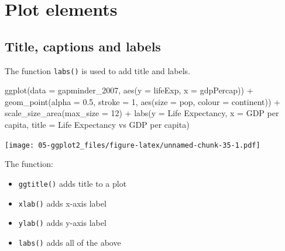 \documentclass[
]{book}
\newenvironment{Shaded}{\begin{snugshade}}{\end{snugshade}}
\newcommand{\AttributeTok}[1]{\textcolor[rgb]{0.77,0.63,0.00}{#1}}
\newcommand{\DecValTok}[1]{\textcolor[rgb]{0.00,0.00,0.81}{#1}}
\newcommand{\FloatTok}[1]{\textcolor[rgb]{0.00,0.00,0.81}{#1}}
\newcommand{\FunctionTok}[1]{\textcolor[rgb]{0.00,0.00,0.00}{#1}}
\newcommand{\NormalTok}[1]{#1}
\newcommand{\SpecialCharTok}[1]{\textcolor[rgb]{0.00,0.00,0.00}{#1}}
\newcommand{\StringTok}[1]{\textcolor[rgb]{0.31,0.60,0.02}{#1}}
\providecommand{\tightlist}{%
  \setlength{\itemsep}{0pt}\setlength{\parskip}{0pt}}
\begin{document}
\hypertarget{plot-elements}{%
\section{Plot elements}\label{plot-elements}}

\hypertarget{title-captions-and-labels}{%
\subsection{Title, captions and labels}\label{title-captions-and-labels}}

The function \texttt{labs()} is used to add title and labels.

\begin{Shaded}
\begin{Highlighting}[]
\FunctionTok{ggplot}\NormalTok{(}\AttributeTok{data =}\NormalTok{ gapminder\_2007, }\FunctionTok{aes}\NormalTok{(}\AttributeTok{y =}\NormalTok{ lifeExp, }\AttributeTok{x =}\NormalTok{ gdpPercap)) }\SpecialCharTok{+} 
  \FunctionTok{geom\_point}\NormalTok{(}\AttributeTok{alpha =} \FloatTok{0.5}\NormalTok{, }\AttributeTok{stroke =} \DecValTok{1}\NormalTok{, }\FunctionTok{aes}\NormalTok{(}\AttributeTok{size =}\NormalTok{ pop, }\AttributeTok{colour =}\NormalTok{ continent)) }\SpecialCharTok{+}
  \FunctionTok{scale\_size\_area}\NormalTok{(}\AttributeTok{max\_size =} \DecValTok{12}\NormalTok{) }\SpecialCharTok{+}
  \FunctionTok{labs}\NormalTok{(}\AttributeTok{y =} \StringTok{\textquotesingle{}Life Expectancy\textquotesingle{}}\NormalTok{, }\AttributeTok{x =} \StringTok{\textquotesingle{}GDP per capita\textquotesingle{}}\NormalTok{, }\AttributeTok{title =} \StringTok{\textquotesingle{}Life Expectancy vs GDP per capita\textquotesingle{}}\NormalTok{)}
\end{Highlighting}
\end{Shaded}

\texttt{[image: 05-ggplot2\_files/figure-latex/unnamed-chunk-35-1.pdf]}

The function:

\begin{itemize}
\tightlist
\item
  \texttt{ggtitle()} adds title to a plot
\item
  \texttt{xlab()} adds x-axis label
\item
  \texttt{ylab()} adds y-axis label
\item
  \texttt{labs()} adds all of the above
\end{itemize}
\end{document}
